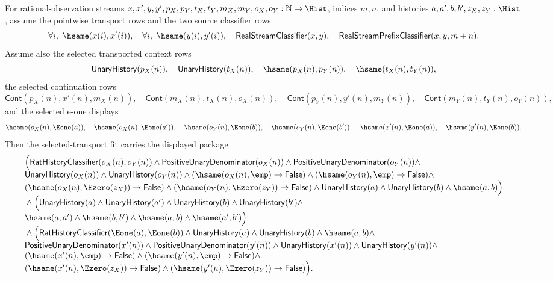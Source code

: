 \begin{theorem}
\label{thm:real-selected-transport-fit-certificate}
For rational-observation streams
$x,x',y,y',p_X,p_Y,t_X,t_Y,m_X,m_Y,o_X,o_Y:\mathbb{N}\to\Hist$,
indices $m,n$, and histories $a,a',b,b',z_X,z_Y:\Hist$, assume the pointwise
transport rows and the two source classifier rows
$$
\forall i,\ \hsame(x(i),x'(i)),\quad
\forall i,\ \hsame(y(i),y'(i)),\quad
\mathsf{RealStreamClassifier}(x,y),\quad
\mathsf{RealStreamPrefixClassifier}(x,y,m+n).
$$
Assume also the selected transported context rows
$$
\mathsf{UnaryHistory}(p_X(n)),\quad
\mathsf{UnaryHistory}(t_X(n)),\quad
\hsame(p_X(n),p_Y(n)),\quad
\hsame(t_X(n),t_Y(n)),
$$
the selected continuation rows
$$
\mathsf{Cont}(p_X(n),x'(n),m_X(n)),\quad
\mathsf{Cont}(m_X(n),t_X(n),o_X(n)),
\quad\mathsf{Cont}(p_Y(n),y'(n),m_Y(n)),\quad
\mathsf{Cont}(m_Y(n),t_Y(n),o_Y(n)),
$$
and the selected e-one displays
$$
\hsame(o_X(n),\Eone(a)),\quad
\hsame(o_X(n),\Eone(a')),\quad
\hsame(o_Y(n),\Eone(b)),\quad
\hsame(o_Y(n),\Eone(b')),\quad
\hsame(x'(n),\Eone(a)),\quad
\hsame(y'(n),\Eone(b)).
$$
Then the selected-transport fit carries the displayed package
$$
\begin{array}{l}
\Bigl(
\mathsf{RatHistoryClassifier}(o_X(n),o_Y(n))\land
\mathsf{PositiveUnaryDenominator}(o_X(n))\land
\mathsf{PositiveUnaryDenominator}(o_Y(n))\land\\
\mathsf{UnaryHistory}(o_X(n))\land
\mathsf{UnaryHistory}(o_Y(n))\land
(\hsame(o_X(n),\emp)\to\mathsf{False})\land
(\hsame(o_Y(n),\emp)\to\mathsf{False})\land\\
(\hsame(o_X(n),\Ezero(z_X))\to\mathsf{False})\land
(\hsame(o_Y(n),\Ezero(z_Y))\to\mathsf{False})\land
\mathsf{UnaryHistory}(a)\land \mathsf{UnaryHistory}(b)\land
\hsame(a,b)
\Bigr)\\
{}\land
\Bigl(
\mathsf{UnaryHistory}(a)\land
\mathsf{UnaryHistory}(a')\land
\mathsf{UnaryHistory}(b)\land
\mathsf{UnaryHistory}(b')\land\\
\hsame(a,a')\land
\hsame(b,b')\land
\hsame(a,b)\land
\hsame(a',b')
\Bigr)\\
{}\land
\Bigl(
\mathsf{RatHistoryClassifier}(\Eone(a),\Eone(b))\land
\mathsf{UnaryHistory}(a)\land
\mathsf{UnaryHistory}(b)\land
\hsame(a,b)\land\\
\mathsf{PositiveUnaryDenominator}(x'(n))\land
\mathsf{PositiveUnaryDenominator}(y'(n))\land
\mathsf{UnaryHistory}(x'(n))\land
\mathsf{UnaryHistory}(y'(n))\land\\
(\hsame(x'(n),\emp)\to\mathsf{False})\land
(\hsame(y'(n),\emp)\to\mathsf{False})\land\\
(\hsame(x'(n),\Ezero(z_X))\to\mathsf{False})\land
(\hsame(y'(n),\Ezero(z_Y))\to\mathsf{False})
\Bigr).
\end{array}
$$
\end{theorem}
